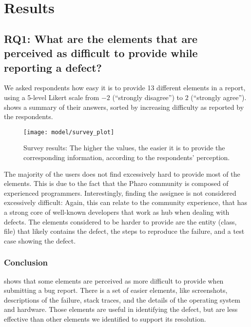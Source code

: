 \section{Results} \label{sec:model-approach}

\subsection*{RQ1: What are the elements that are perceived as difficult to provide while reporting a defect?}

We asked respondents how easy it is to provide 13 different elements in a report, using a 5-level Likert scale from $-2$ (``strongly disagree'') to $2$ (``strongly agree'').
 shows a summary of their answers, sorted by increasing difficulty as reported by the respondents.
%
\begin{figure}[ht]
\centering
\texttt{[image: model/survey\_plot]}
\caption{Survey results: The higher the values, the easier it is to provide the corresponding information, according to the respondents' perception.}
\label{fig:survey}
\end{figure}
%
The majority of the users does not find excessively hard to provide most of the elements.
This is due to the fact that the Pharo community is composed of experienced programmers.
Interestingly, finding the assignee is not considered excessively difficult: Again, this can relate to the community experience, that has a strong core of well-known developers that work as hub when dealing with defects.
The elements considered to be harder to provide are the entity (\eg class, file) that likely contains the defect, the steps to reproduce the failure, and a test case showing the defect.


\subsubsection{Conclusion}

 shows that some elements are perceived as more difficult to provide when submitting a bug report.
There is a set of easier elements, like screenshots, descriptions of the failure, stack traces, and the details of the operating system and hardware.
Those elements are useful in identifying the defect, but are less effective than other elements we identified to support its resolution.


